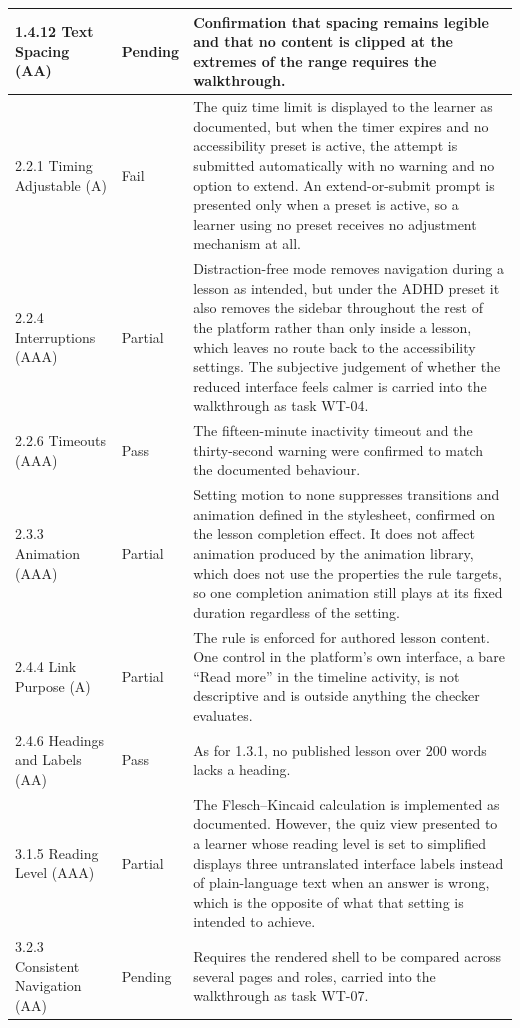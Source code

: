 \documentclass[12pt, oneside]{article} %
\newcommand{\tabbreak}{\hyphenpenalty=200\exhyphenpenalty=200\tolerance=4000\hbadness=10000\hspace{0pt}}
\begin{document}
{\begin{longtable}{|>{\raggedright\arraybackslash\tabbreak}p{2.2cm}|>{\raggedright\arraybackslash\tabbreak}p{1.5cm}|>{\raggedright\arraybackslash\tabbreak}p{9.8cm}|}
1.4.12 Text Spacing (AA) & Pending & Confirmation that spacing remains legible and that no content is clipped at the extremes of the range requires the walkthrough. \\ \hline
2.2.1 Timing Adjustable (A) & Fail & The quiz time limit is displayed to the learner as documented, but when the timer expires and no accessibility preset is active, the attempt is submitted automatically with no warning and no option to extend. An extend-or-submit prompt is presented only when a preset is active, so a learner using no preset receives no adjustment mechanism at all. \\ \hline
2.2.4 Interruptions (AAA) & Partial & Distraction-free mode removes navigation during a lesson as intended, but under the ADHD preset it also removes the sidebar throughout the rest of the platform rather than only inside a lesson, which leaves no route back to the accessibility settings. The subjective judgement of whether the reduced interface feels calmer is carried into the walkthrough as task WT-04. \\ \hline
2.2.6 Timeouts (AAA) & Pass & The fifteen-minute inactivity timeout and the thirty-second warning were confirmed to match the documented behaviour. \\ \hline
2.3.3 Animation (AAA) & Partial & Setting motion to none suppresses transitions and animation defined in the stylesheet, confirmed on the lesson completion effect. It does not affect animation produced by the animation library, which does not use the properties the rule targets, so one completion animation still plays at its fixed duration regardless of the setting. \\ \hline
2.4.4 Link Purpose (A) & Partial & The rule is enforced for authored lesson content. One control in the platform's own interface, a bare ``Read more'' in the timeline activity, is not descriptive and is outside anything the checker evaluates. \\ \hline
2.4.6 Headings and Labels (AA) & Pass & As for 1.3.1, no published lesson over 200 words lacks a heading. \\ \hline
3.1.5 Reading Level (AAA) & Partial & The Flesch--Kincaid calculation is implemented as documented. However, the quiz view presented to a learner whose reading level is set to simplified displays three untranslated interface labels instead of plain-language text when an answer is wrong, which is the opposite of what that setting is intended to achieve. \\ \hline
3.2.3 Consistent Navigation (AA) & Pending & Requires the rendered shell to be compared across several pages and roles, carried into the walkthrough as task WT-07. \\ \hline

\end{longtable}}
\end{document}
